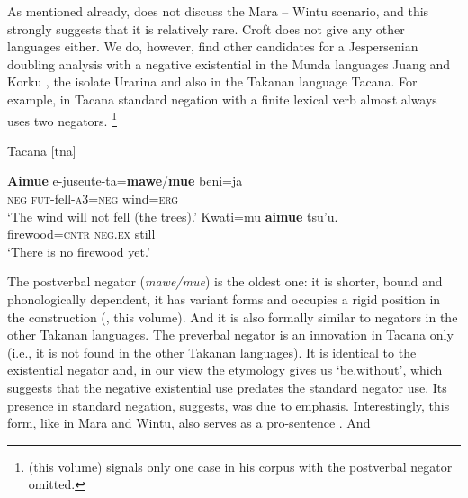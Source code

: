 ﻿\documentclass[output=paper]{langsci/langscibook}
\begin{document}
As mentioned already, \textcites{Veselinova2010}{Veselinova2013}{Veselinova2014}{Veselinova2015}{Veselinova2016} does not
discuss the Mara -- Wintu scenario, and this strongly suggests that it is
relatively rare. Croft does not give any other languages either. We do,
however, find other candidates for a Jespersenian doubling analysis with a
negative existential in the Munda languages Juang
\parencite[150--151]{Anderson2007} and Korku \parencites[64--67]{Nagaraja1999}
[279--281]{Zide2008}, the isolate Urarina and also in the Takanan
language Tacana. For example, in Tacana standard negation with a finite
lexical verb almost always uses two negators.%
%
\footnote{\citeauthor{Guillaume2019} (this volume) signals only one case in his corpus with the postverbal negator
omitted.}%
%
\begin{exe}\ex\label{ex:int-tacana-wind-firewood}
Tacana [tna] 
\begin{xlist}
    \ex\gll \textbf{Aimue}    e-juseute-ta=\textbf{mawe}/\textbf{mue}
    beni=ja \\
    \textsc{neg}    \textsc{fut-}fell-\textsc{a}3=\textsc{neg}    wind=\textsc{erg} \\
    \glt `The wind will not fell (the trees).'
    \ex\gll Kwati=mu    \textbf{aimue}    tsu'u.\\
firewood=\textsc{cntr}  \textsc{neg.ex}  still\\
\glt `There is no firewood yet.'
    \end{xlist}\end{exe}
%
The postverbal negator (\textit{mawe/mue}) is the oldest one: it is
shorter, bound and phonologically dependent, it has variant forms and
occupies a rigid position in the construction (\citealt{Guillaume2016a},
\citeauthor{Guillaume2019} this volume). And it is also formally similar to
negators in the
other Takanan languages. The preverbal negator is an innovation in
Tacana
only (i.e., it is not found in the other Takanan languages). It is
identical to the existential negator and, in our view 
\parencite{AuweraKrasnoukhova2018} the etymology gives us `be.without',
which suggests that the negative existential use predates the standard
negator use. Its presence in standard negation, \textcite{Guillaume2016a}
suggests, was due to emphasis. Interestingly, this form, like in Mara and
Wintu, also serves as a pro-sentence \parencites{Guillaume2016a}{Guillaume2017}. And
\end{document}
